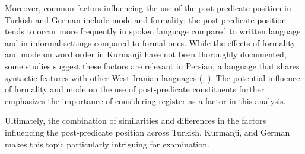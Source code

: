 Moreover, common factors influencing the use of the post-predicate position in Turkish and German include mode and formality: the post-predicate position tends to occur more frequently in spoken language compared to written language and in informal settings compared to formal ones. While the effects of formality and mode on word order in Kurmanji have not been thoroughly documented, some studies suggest these factors are relevant in Persian, a language that shares syntactic features with other West Iranian languages (\citealt{Frommer1981}, \citealt{Haig_post-predicate_EtAl2024-1}). The potential influence of formality and mode on the use of post-predicate constituents further emphasizes the importance of considering register as a factor in this analysis.

Ultimately, the combination of similarities and differences in the factors influencing the post-predicate position across Turkish, Kurmanji, and German makes this topic particularly intriguing for examination.

